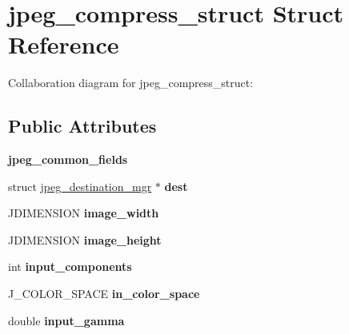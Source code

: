 \hypertarget{structjpeg__compress__struct}{\section{jpeg\+\_\+compress\+\_\+struct Struct Reference}
\label{structjpeg__compress__struct}
}


Collaboration diagram for jpeg\+\_\+compress\+\_\+struct\+:
\subsection*{Public Attributes}
\begin{DoxyCompactItemize}
\item 
\hypertarget{structjpeg__compress__struct_a831013770bec36f77dd2048c8771513c}{{\bfseries jpeg\+\_\+common\+\_\+fields}}\label{structjpeg__compress__struct_a831013770bec36f77dd2048c8771513c}

\item 
\hypertarget{structjpeg__compress__struct_ab31c2c756e309dee8d0318557353ba40}{struct \hyperlink{structjpeg__destination__mgr}{jpeg\+\_\+destination\+\_\+mgr} $\ast$ {\bfseries dest}}\label{structjpeg__compress__struct_ab31c2c756e309dee8d0318557353ba40}

\item 
\hypertarget{structjpeg__compress__struct_ac8e50a2c70252c53f3e10b886818f2cf}{J\+D\+I\+M\+E\+N\+S\+I\+O\+N {\bfseries image\+\_\+width}}\label{structjpeg__compress__struct_ac8e50a2c70252c53f3e10b886818f2cf}

\item 
\hypertarget{structjpeg__compress__struct_a30863835e7785b7df800811f842b2da0}{J\+D\+I\+M\+E\+N\+S\+I\+O\+N {\bfseries image\+\_\+height}}\label{structjpeg__compress__struct_a30863835e7785b7df800811f842b2da0}

\item 
\hypertarget{structjpeg__compress__struct_af5b66b039ea5a96bb2f5cf0254115837}{int {\bfseries input\+\_\+components}}\label{structjpeg__compress__struct_af5b66b039ea5a96bb2f5cf0254115837}

\item 
\hypertarget{structjpeg__compress__struct_ac27d1dfbbbd677aab9fb570c58ca960d}{J\+\_\+\+C\+O\+L\+O\+R\+\_\+\+S\+P\+A\+C\+E {\bfseries in\+\_\+color\+\_\+space}}\label{structjpeg__compress__struct_ac27d1dfbbbd677aab9fb570c58ca960d}

\item 
\hypertarget{structjpeg__compress__struct_ac5d2e16382ea12fb4e3bd6a69f7831ea}{double {\bfseries input\+\_\+gamma}}\label{structjpeg__compress__struct_ac5d2e16382ea12fb4e3bd6a69f7831ea}


\end{DoxyCompactItemize}
